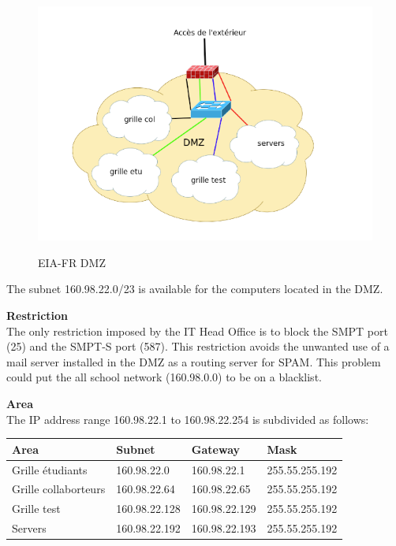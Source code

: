 \begin{figure}[ht]
	\caption{EIA-FR DMZ}
  	\centering
	\includegraphics[scale=0.6]{./pic/dmz1.png}
	\label{fig:eia_dmz}
\end{figure}

The subnet 160.98.22.0/23 is available for the computers located in the DMZ. \s

\textbf{Restriction}\\
The only restriction imposed by the IT Head Office is to block the SMPT port (25) and the SMPT-S port (587). This restriction avoids the unwanted use of a mail server installed in the DMZ as a routing server for SPAM. This problem could put the all school network (160.98.0.0) to be on a blacklist. \s

\textbf{Area}\\
The IP address range 160.98.22.1 to 160.98.22.254 is subdivided as follows:

\begin{center}
\begin{tabular}{|p{2.5cm}|p{2.5cm}|p{2.5cm}|p{2.5cm}|}
\hline
\textbf{Area} & \textbf{Subnet}	& \textbf{Gateway} & \textbf{Mask}\\ \hline
Grille étudiants & 160.98.22.0 & 160.98.22.1 & 255.55.255.192 \\ \hline
Grille collaborteurs & 160.98.22.64 & 160.98.22.65 & 255.55.255.192 \\ \hline
Grille test & 160.98.22.128 & 160.98.22.129 & 255.55.255.192 \\ \hline
Servers & 160.98.22.192 & 160.98.22.193 & 255.55.255.192 \\ \hline
\end{tabular}
\end{center}\s

